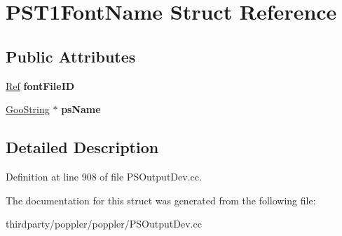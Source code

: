\hypertarget{struct_p_s_t1_font_name}{}\section{P\+S\+T1\+Font\+Name Struct Reference}
\label{struct_p_s_t1_font_name}
\subsection*{Public Attributes}
\begin{DoxyCompactItemize}
\item 
\mbox{\label{struct_p_s_t1_font_name_aab552fb8e2a55ebe6af596849d01dfda}} 
\hyperlink{struct_ref}{Ref} {\bfseries font\+File\+ID}
\item 
\mbox{\label{struct_p_s_t1_font_name_aa452a757bf8690bdae8905cb81fc8df8}} 
\hyperlink{class_goo_string}{Goo\+String} $\ast$ {\bfseries ps\+Name}
\end{DoxyCompactItemize}


\subsection{Detailed Description}


Definition at line 908 of file P\+S\+Output\+Dev.\+cc.



The documentation for this struct was generated from the following file\+:\begin{DoxyCompactItemize}
\item 
thirdparty/poppler/poppler/P\+S\+Output\+Dev.\+cc\end{DoxyCompactItemize}
